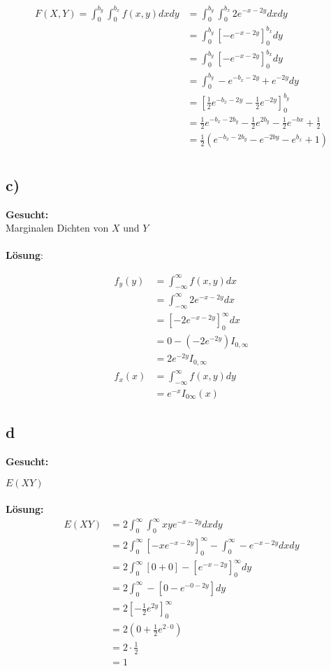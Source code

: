 \documentclass{article}
\begin{document}
\begin{align*}
    F(X,Y) = \int_{0}^{b_y} \int_{0}^{b_x} f(x,y) dx dy 
    &=\int_{0}^{b_y} \int_{0}^{b_x} 2e^{-x-2y} dx dy \\ 
    &= \int_{0}^{b_y} \left[-e^{-x-2y}\right]_0^{b_x} dy \\
    &= \int_{0}^{b_y} \left[-e^{-x-2y}\right]_0^{b_x} dy\\
    &= \int_{0}^{b_y}  -e^{-b_x-2y} + e^{-2y} dy \\
    &= \left[\frac{1}{2} e^{-b_x-2 y}- \frac{1}{2}e^{-2y}\right]_0^{b_y} \\
    &= \frac{1}{2} e^{-b_x - 2b_y} - \frac{1}{2} e^{2b_y} - \frac{1}{2} e^{-bx} + \frac{1}{2}  \\
    &= \frac{1}{2} (e^{-b_x - 2b_y} -e^{-2by} - e^{b_x} + 1) \\
\end{align*}

\subsection*{c)}
\textbf{Gesucht:} \\

Marginalen Dichten von $X$ und $Y$ \\\\
\textbf{Lösung}:

\begin{align*}
    f_y(y) &= \int_{-\infty}^{\infty} f(x,y) dx \\
    &= \int_{-\infty}^{\infty} 2e^{-x-2y} dx \\
    &= \left[-2e^{-x-2y}\right]_0^{\infty} dx \\
    &= 0 - (- 2 e^{-2y}) I_{0, \infty} \\
    &= 2 e^{-2y} I_{0, \infty} \\
    f_x(x) &= \int_{-\infty}^{\infty} f(x,y) dy \\
    &= e^{-x} I_{0 \infty}(x) 
\end{align*}
\subsection*{d} 
\textbf{Gesucht:}

$E(XY)$ \\\\
\textbf{Lösung:}\\

\begin{align*}
    E(XY) &= 2 \int_{0}^{\infty}\int_{0}^{\infty} xy e^{-x-2y} dxdy \\
    &= 2\int_{0}^{\infty} [-xe^{-x-2y}]_0^{\infty} - \int_{0}^{\infty} -e^{-x-2y} dxdy \\
    &= 2\int_{0}^{\infty} \left[0 + 0\right] -\left[e^{-x-2y}\right]_0^{\infty} dy \\
    &= 2\int_{0}^{\infty}-  \left[ 0- e^{-0-2y}\right] dy \\
    &= 2\left[-\frac{1}{2}e^{2y}\right]_0^{\infty}\\
    &= 2(0 + \frac{1}{2} e^{2\cdot 0}) \\
    &= 2 \cdot \frac{1}{2} \\
    &= 1
\end{align*}
\end{document}
